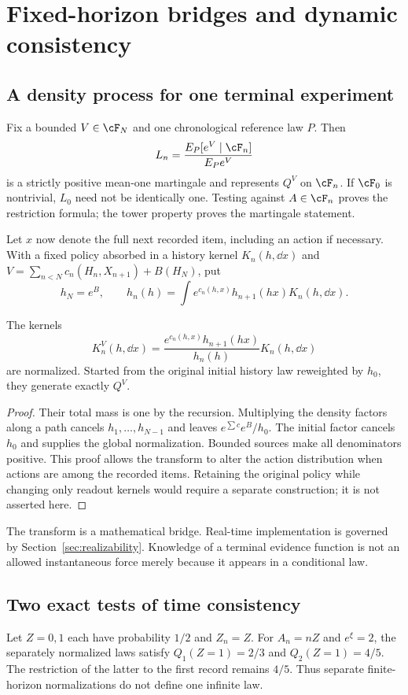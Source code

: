 \section{Fixed-horizon bridges and dynamic consistency}\label{sec:chronology}
\subsection{A density process for one terminal experiment}
Fix a bounded $V\in\cF_N$ and one chronological reference law $P$. Then
\[
 L_n=\frac{E_P[e^V\mid\cF_n]}{E_Pe^V}
\]
is a strictly positive mean-one martingale and represents $Q^V$ on $\cF_n$. If $\cF_0$ is nontrivial, $L_0$ need not be identically one. Testing against $A\in\cF_n$ proves the restriction formula; the tower property proves the martingale statement.

Let $x$ now denote the full next recorded item, including an action if necessary. With a fixed policy absorbed in a history kernel $K_n(h,\dd x)$ and
$V=\sum_{n<N}c_n(H_n,X_{n+1})+B(H_N)$, put
\[
 h_N=e^B,\qquad h_n(h)=\int e^{c_n(h,x)}h_{n+1}(hx)K_n(h,\dd x).
\]

\begin{theorem}\label{thm:history-doob}
The kernels
\[
 K_n^V(h,\dd x)=\frac{e^{c_n(h,x)}h_{n+1}(hx)}{h_n(h)}K_n(h,\dd x)
\]
are normalized. Started from the original initial history law reweighted by $h_0$, they generate exactly $Q^V$.
\end{theorem}
\begin{proof}
Their total mass is one by the recursion. Multiplying the density factors along a path cancels $h_1,\ldots,h_{N-1}$ and leaves $e^{\sum c}e^B/h_0$. The initial factor cancels $h_0$ and supplies the global normalization. Bounded sources make all denominators positive. This proof allows the transform to alter the action distribution when actions are among the recorded items. Retaining the original policy while changing only readout kernels would require a separate construction; it is not asserted here.
\end{proof}

The transform is a mathematical bridge. Real-time implementation is governed by Section~\ref{sec:realizability}. Knowledge of a terminal evidence function is not an allowed instantaneous force merely because it appears in a conditional law.

\subsection{Two exact tests of time consistency}
\begin{example}\label{ex:terminal}
Let $Z=0,1$ each have probability $1/2$ and $Z_n=Z$. For $A_n=nZ$ and $e^\xi=2$, the separately normalized laws satisfy
$Q_1(Z=1)=2/3$ and $Q_2(Z=1)=4/5$. The restriction of the latter to the first record remains $4/5$. Thus separate finite-horizon normalizations do not define one infinite law.
\end{example}

